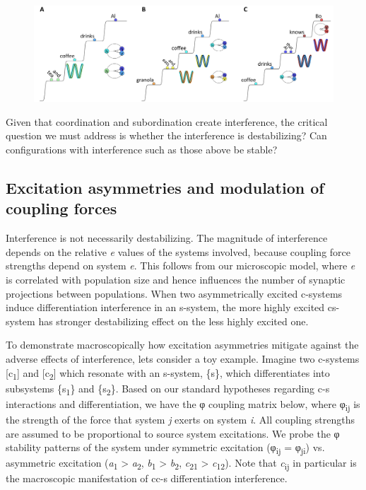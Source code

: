   
\begin{figure}
\includegraphics[width=\textwidth]{figures/Tilsen-img94.png}
\caption{\missingcaption}
\label{fig:4:44}
\end{figure}
 

  Given that coordination and subordination create interference, the critical question we must address is whether the interference is destabilizing? Can configurations with interference such as those above be stable? 

\subsection{Excitation asymmetries and modulation of coupling forces}

Interference is not necessarily destabilizing. The magnitude of interference depends on the relative \textit{e} values of the systems involved, because coupling force strengths depend on system \textit{e}. This follows from our microscopic model, where \textit{e} is correlated with population size and hence influences the number of synaptic projections between populations. When two asymmetrically excited c-systems induce differentiation interference in an s-system, the more highly excited cs-system has stronger destabilizing effect on the less highly excited one.

  To demonstrate macroscopically how excitation asymmetries mitigate against the adverse effects of interference, lets consider a toy example. Imagine two c-systems [c\textsubscript{1}] and [c\textsubscript{2}] which resonate with an s-system, \{s\}, which differentiates into subsystems \{s\textsubscript{1}\} and \{s\textsubscript{2}\}. Based on our standard hypotheses regarding c-s interactions and differentiation, we have the φ coupling matrix below, where φ\textsubscript{ij} is the strength of the force that system \textit{j} exerts on system \textit{i}. All coupling strengths are assumed to be proportional to source system excitations. We probe the φ stability patterns of the system under symmetric excitation (φ\textsubscript{ij} = φ\textsubscript{ji}) vs. asymmetric excitation (\textit{a}\textsubscript{1} > \textit{a}\textsubscript{2}, \textit{b}\textsubscript{1} > \textit{b}\textsubscript{2}, \textit{c}\textsubscript{21} > \textit{c}\textsubscript{12}). Note that \textit{c}\textsubscript{ij} in particular is the macroscopic manifestation of cc-s differentiation interference.

